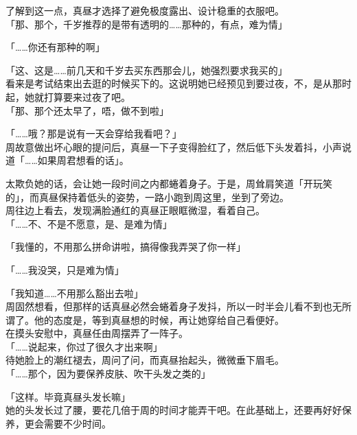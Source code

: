 了解到这一点，真昼才选择了避免极度露出、设计稳重的衣服吧。\\

「那、那个，千岁推荐的是带有透明的……那种的，有点，难为情」

「……你还有那种的啊」

「这、这是……前几天和千岁去买东西那会儿，她强烈要求我买的」\\

看来是考试结束出去逛的时候买下的。这说明她已经预见到要过夜，不，是从那时起，她就打算要来过夜了吧。\\

「那、那个还太早了，唔，做不到啦」

「……哦？那是说有一天会穿给我看吧？」\\

周故意做出坏心眼的提问后，真昼一下子变得脸红了，然后低下头发着抖，小声说道「……如果周君想看的话」。

太欺负她的话，会让她一段时间之内都蜷着身子。于是，周耸肩笑道「开玩笑的」，而真昼保持着低头的姿势，一路小跑到周这里，坐到了旁边。\\

周往边上看去，发现满脸通红的真昼正眼眶微湿，看着自己。\\

「……不、不是不愿意，是、是难为情」

「我懂的，不用那么拼命讲啦，搞得像我弄哭了你一样」

「……我没哭，只是难为情」

「我知道……不用那么豁出去啦」\\

周固然想看，但那样的话真昼必然会蜷着身子发抖，所以一时半会儿看不到也无所谓了。他的态度是，等到真昼想的时候，再让她穿给自己看便好。\\

在摸头安慰中，真昼任由周摆弄了一阵子。\\

「……说起来，你过了很久才出来啊」\\

待她脸上的潮红褪去，周问了问，而真昼抬起头，微微垂下眉毛。\\

「……那个，因为要保养皮肤、吹干头发之类的」

「这样。毕竟真昼头发长嘛」\\

她的头发长过了腰，要花几倍于周的时间才能弄干吧。在此基础上，还要再好好保养，更会需要不少时间。\\

